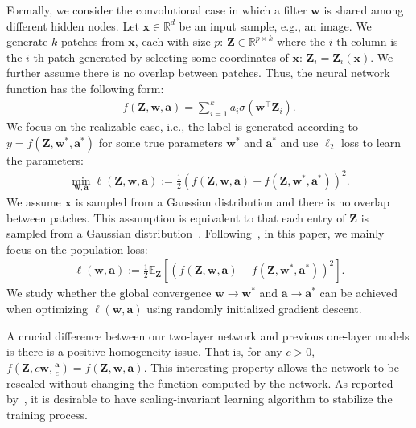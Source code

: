 \documentclass{article}
\newcommand{\firstlayer}{w}
\newcommand{\secondlayer}{a}
\def\vw{\mathbf{w}}
\def\va{\mathbf{a}}
\newcommand{\mat}[1]{\mathbf{#1}}
\newcommand{\vect}[1]{\mathbf{#1}}
\newcommand{\expect}{\mathbb{E}}
\begin{document}
Formally, we consider the convolutional case in which a filter $\vw$ is shared among different hidden nodes. Let $\vect{x} \in \mathbb{R}^{d}$ be an input sample, e.g., an image. We generate $k$ patches from $\vect{x}$, each with size $p$: $\mat Z \in \mathbb{R}^{p \times k}$ where the $i$-th column is the $i$-th patch generated by selecting some coordinates of $\vect{x}$: $\vect{Z}_i = \vect{Z}_i(\vect{x})$. 
We further assume there is no overlap between patches.
Thus, the neural network function has the following form:
\begin{align*}
f(\mat{Z},\vect{w},\vect{\secondlayer}) =  \sum_{i=1}^{k} \secondlayer_i\sigma\left(\vect{w}^\top \vect{Z}_i\right). 
\end{align*}We focus on the realizable case, i.e., the label is generated according to $y = f\left(\mat{Z},\vect{\firstlayer}^*,\vect{\secondlayer}^*\right)$ for some true parameters $\vect{\firstlayer}^*$ and $\vect{\secondlayer}^*$ and use $\ell_2$ loss to learn the parameters:\begin{align*}
\min_{\vect{w},\vect{\secondlayer}} \ell(\vect{Z},\vect{w},\vect{\secondlayer}) := \frac{1}{2}\left(f\left(\mat{Z},\vect{w},\vect{\secondlayer}\right) - f\left(\mat{Z},\vect{\firstlayer}^*,\vect{\secondlayer}^*\right)\right)^2. \label{eqn:individual_obj}
\end{align*} 
We assume $\vect{x}$ is sampled from a Gaussian distribution and there is no overlap between patches.
This assumption is equivalent to that each entry of $\mat{Z}$ is sampled from a Gaussian distribution~\citep{brutzkus2017globally,zhong2017recovery}.
Following~\citep{zhong2017learning,zhong2017recovery,li2017convergence,tian2017analytical,brutzkus2017globally,shalev2017weight}, 
in this paper, we mainly focus on the population loss:
\begin{align*}
	\ell\left(\vect{w},\vect{\secondlayer}\right) := \frac12\expect_{\mat{Z}}\left[\left(f\left(\mat{Z},\vect{\firstlayer},\vect{\secondlayer}\right)-f\left(\mat{Z},\vect{\firstlayer}^*,\vect{\secondlayer}^*\right)\right)^2\right].
\end{align*}
We study whether the global convergence $\vw\rightarrow\vw^*$ and $\va\rightarrow\va^*$ can be achieved when optimizing $\ell(\vect{w},\vect{a})$ using randomly initialized gradient descent.

A crucial difference between our two-layer network and previous one-layer models is there is a positive-homogeneity issue.
That is, for any $c > 0$, $f\left(\mat{Z},c\vect{w},\frac{\vect{\secondlayer}}{c}\right) = f\left(\mat{Z},\vect{w},\vect{\secondlayer}\right)$.
This interesting
property allows the network to be rescaled without changing the function computed by the network.
As reported by~\cite{neyshabur2015path}, it is desirable to have scaling-invariant learning algorithm to stabilize the training process.
\end{document}
